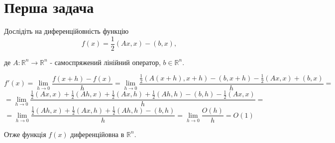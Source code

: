 \section{Перша задача}


\begin{tcolorbox}[title=Задача 1]
    Дослідіть на диференційовність функцію
    $$
    f(x)=\frac{1}{2}(A x, x)-(b, x),
    $$

    де $A: \mathbb{R}^n \rightarrow \mathbb{R}^n$ - самоспряжений лінійний оператор, $b \in \mathbb{R}^n$.
\end{tcolorbox}


$$f'(x) = \lim_{h \to 0} \frac{f(x+h) - f(x)}{h} = 
\lim_{h \to 0} \frac{
    \frac{1}{2}(A(x+h), x+h) - (b, x+h) - \frac{1}{2}(Ax, x) + (b, x)}{h}=
$$
$$
= \lim_{h \to 0} \frac{
    \frac{1}{2}(Ax, x) + \frac{1}{2}(Ah, x) + \frac{1}{2}(Ax, h) + \frac{1}{2}(Ah, h) - (b, h) - \frac{1}{2}(Ax, x)}{h}=
$$
$$
= \lim_{h \to 0} \frac{
    \frac{1}{2}(Ah, x) + \frac{1}{2}(Ax, h) + \frac{1}{2}(Ah, h) - (b, h)}{h}=
    \lim_{h \to 0}\frac{O(h)}{h} = O(1)
$$

Отже функція $f(x)$ диференційовна в $\mathbb{R}^n$.